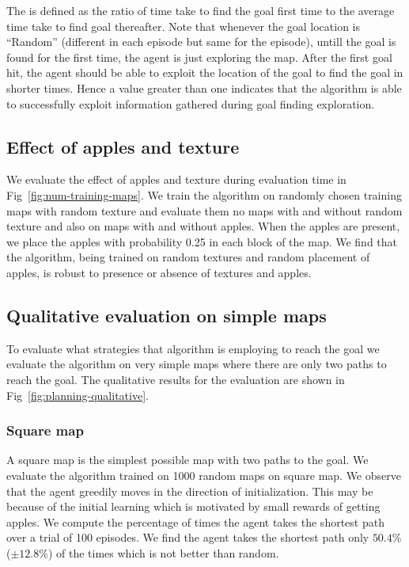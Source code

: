 The \LatencyOneGtOne{} is defined as the ratio of time take to find the goal first time to the average time take to find goal thereafter.
Note that whenever the goal location is ``Random'' (different in each episode but same for the episode), untill the goal is found for the first time, the agent is just exploring the map.
After the first goal hit, the agent should be able to exploit the location of the goal to find the goal in shorter times.
Hence a \LatencyOneGtOne{} value greater than one indicates that the algorithm is able to successfully exploit information gathered during goal finding exploration.


\subsection{Effect of apples and texture}
We evaluate the effect of apples and texture during evaluation time in Fig~\ref{fig:num-training-maps}.
We train the algorithm on randomly chosen training maps with random texture and evaluate them no maps with and without random texture and also on maps with and without apples. When the apples are present, we place the apples with probability 0.25 in each block of the map.
We find that the algorithm, being trained on random textures and random placement of apples, is robust to presence or absence of textures and apples.


\subsection{Qualitative evaluation on simple maps}
To evaluate what strategies that algorithm is employing to reach the
goal we evaluate the algorithm on very simple maps where there are only two
paths to reach the goal. The qualitative results for the evaluation are shown
in Fig~\ref{fig:planning-qualitative}.

\subsubsection{Square map}
A square map is the simplest possible map with two paths to the goal.
We evaluate the algorithm trained on 1000 random maps on square map.
We observe that the agent greedily moves in the direction of
initialization.
This may be because of the initial learning which is
motivated by small rewards of getting apples.
We compute the percentage of times the agent takes the shortest path over a trial of 100 episodes.
We find the agent takes the shortest path only $50.4$\% ($\pm 12.8$\%) of the times which is not better than random.

